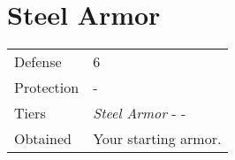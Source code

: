 \section{Steel Armor}
\label{armor:steel_armor}


\noindent\begin{tabularx}{\textwidth}[l]{lX}
	Defense
	& 6
\\
	Protection
	& -
\\
	Tiers
	& \textit{Steel Armor} - \nameref{armor:noble_armor} - \nameref{armor:gaias_armor}
\\
	Obtained
	& Your starting armor.
\end{tabularx}

